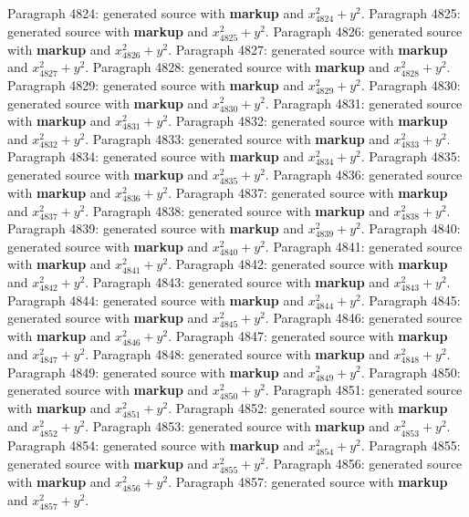\documentclass{article}
\begin{document}
Paragraph 4824: generated source with \textbf{markup} and $x_{4824}^2 + y^2$.
Paragraph 4825: generated source with \textbf{markup} and $x_{4825}^2 + y^2$.
Paragraph 4826: generated source with \textbf{markup} and $x_{4826}^2 + y^2$.
Paragraph 4827: generated source with \textbf{markup} and $x_{4827}^2 + y^2$.
Paragraph 4828: generated source with \textbf{markup} and $x_{4828}^2 + y^2$.
Paragraph 4829: generated source with \textbf{markup} and $x_{4829}^2 + y^2$.
Paragraph 4830: generated source with \textbf{markup} and $x_{4830}^2 + y^2$.
Paragraph 4831: generated source with \textbf{markup} and $x_{4831}^2 + y^2$.
Paragraph 4832: generated source with \textbf{markup} and $x_{4832}^2 + y^2$.
Paragraph 4833: generated source with \textbf{markup} and $x_{4833}^2 + y^2$.
Paragraph 4834: generated source with \textbf{markup} and $x_{4834}^2 + y^2$.
Paragraph 4835: generated source with \textbf{markup} and $x_{4835}^2 + y^2$.
Paragraph 4836: generated source with \textbf{markup} and $x_{4836}^2 + y^2$.
Paragraph 4837: generated source with \textbf{markup} and $x_{4837}^2 + y^2$.
Paragraph 4838: generated source with \textbf{markup} and $x_{4838}^2 + y^2$.
Paragraph 4839: generated source with \textbf{markup} and $x_{4839}^2 + y^2$.
Paragraph 4840: generated source with \textbf{markup} and $x_{4840}^2 + y^2$.
Paragraph 4841: generated source with \textbf{markup} and $x_{4841}^2 + y^2$.
Paragraph 4842: generated source with \textbf{markup} and $x_{4842}^2 + y^2$.
Paragraph 4843: generated source with \textbf{markup} and $x_{4843}^2 + y^2$.
Paragraph 4844: generated source with \textbf{markup} and $x_{4844}^2 + y^2$.
Paragraph 4845: generated source with \textbf{markup} and $x_{4845}^2 + y^2$.
Paragraph 4846: generated source with \textbf{markup} and $x_{4846}^2 + y^2$.
Paragraph 4847: generated source with \textbf{markup} and $x_{4847}^2 + y^2$.
Paragraph 4848: generated source with \textbf{markup} and $x_{4848}^2 + y^2$.
Paragraph 4849: generated source with \textbf{markup} and $x_{4849}^2 + y^2$.
Paragraph 4850: generated source with \textbf{markup} and $x_{4850}^2 + y^2$.
Paragraph 4851: generated source with \textbf{markup} and $x_{4851}^2 + y^2$.
Paragraph 4852: generated source with \textbf{markup} and $x_{4852}^2 + y^2$.
Paragraph 4853: generated source with \textbf{markup} and $x_{4853}^2 + y^2$.
Paragraph 4854: generated source with \textbf{markup} and $x_{4854}^2 + y^2$.
Paragraph 4855: generated source with \textbf{markup} and $x_{4855}^2 + y^2$.
Paragraph 4856: generated source with \textbf{markup} and $x_{4856}^2 + y^2$.
Paragraph 4857: generated source with \textbf{markup} and $x_{4857}^2 + y^2$.
\end{document}
